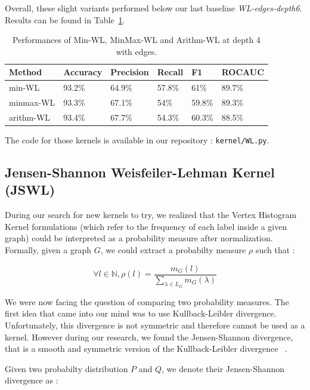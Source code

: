 \documentclass{IEEEtran}
\begin{document}
Overall, these slight variants performed below our last baseline \emph{WL-edges-depth6}.
Results can be found in Table~\ref{tab:method_comparison_depth4}.
\begin{table}[h]
    \centering
    \begin{tabular}{l|llll|l}
        Method    & Accuracy & Precision & Recall & F1     & ROCAUC \\
        \hline
        min-WL    & 93.2\%   & 64.9\%    & 57.8\% & 61\%   & 89.7\% \\
        minmax-WL & 93.3\%   & 67.1\%    & 54\%   & 59.8\% & 89.3\% \\
        arithm-WL & 93.4\%   & 67.7\%    & 54.3\% & 60.3\% & 88.5\% \\
    \end{tabular}
    \caption{Performances of Min-WL, MinMax-WL and Arithm-WL at depth 4 with edges.}
    \label{tab:method_comparison_depth4}
\end{table}

The code for those kernels is available in our repository : \texttt{kernel/WL.py}.

\subsection{Jensen-Shannon Weisfeiler-Lehman Kernel (JSWL)}

During our search for new kernels to try, we realized that the Vertex Histogram Kernel formulations (which refer to the frequency of each label inside a given graph) could be interpreted as a probability measure after normalization.
Formally, given a graph $G$, we could extract a probabilty measure
$\rho$ such that :

\begin{equation*}
    \forall l \in \mathbb N, \rho (l) = \frac{m_G(l)}{\sum_{\lambda \in L_G}{m_G(\lambda)}}
\end{equation*}

We were now facing the question of comparing two probability measures.
The first idea that came into our mind was to use Kullback-Leibler divergence.
Unfortunately, this divergence is not symmetric and therefore cannot be used as a kernel.
However during our research, we found the Jensen-Shannon divergence,
that is a smooth and symmetric version of the Kullback-Leibler divergence ~\cite{callut2011sequence}.

Given two probabilty distribution $P$ and $Q$, we denote their
Jensen-Shannon divergence as :
\end{document}
